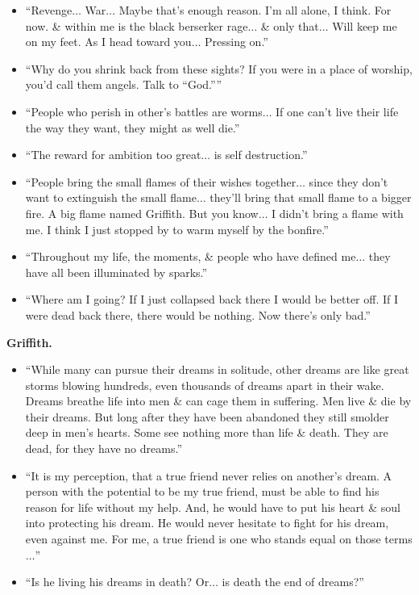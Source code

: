 \documentclass{article}
\begin{document}
\begin{enumerate}
\begin{itemize}
    	\item ``Revenge$\ldots$ War$\ldots$ Maybe that's enough reason. I'm all alone, I think. For now. \& within me is the black berserker rage$\ldots$ \& only that$\ldots$ Will keep me on my feet. As I head toward you$\ldots$ Pressing on.''
    	\item ``Why do you shrink back from these sights? If you were in a place of worship, you'd call them angels. Talk to ``God.''''
    	\item ``People who perish in other's battles are worms$\ldots$ If one can't live their life the way they want, they might as well die.''
    	\item ``The reward for ambition too great$\ldots$ is self destruction.''
    	\item ``People bring the small flames of their wishes together$\ldots$ since they don't want to extinguish the small flame$\ldots$ they'll bring that small flame to a bigger fire. A big flame named Griffith. But you know$\ldots$ I didn't bring a flame with me. I think I just stopped by to warm myself by the bonfire.''
    	\item ``Throughout my life, the moments, \& people who have defined me$\ldots$ they have all been illuminated by sparks.''
    	\item ``Where am I going? If I just collapsed back there I would be better off. If I were dead back there, there would be nothing. Now there's only bad.''
    \end{itemize}
	{\bf Griffith.}
	\begin{itemize}
		\item ``While many can pursue their dreams in solitude, other dreams are like great storms blowing hundreds, even thousands of dreams apart in their wake. Dreams breathe life into men \& can cage them in suffering. Men live \& die by their dreams. But long after they have been abandoned they still smolder deep in men's hearts. Some see nothing more than life \& death. They are dead, for they have no dreams.''
		\item ``It is my perception, that a true friend never relies on another's dream. A person with the potential to be my true friend, must be able to find his reason for life without my help. And, he would have to put his heart \& soul into protecting his dream. He would never hesitate to fight for his dream, even against me. For me, a true friend is one who stands equal on those terms$\ldots$''
		\item ``Is he living his dreams in death? Or$\ldots$ is death the end of dreams?''

\end{itemize}
\end{enumerate}
\end{document}
